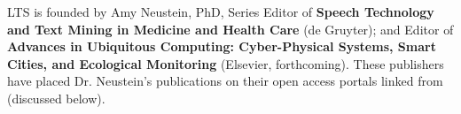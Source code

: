 \documentclass[11pt,letterpaper]{article}
\newcommand{\textscc}[1]{{\color{orr!35!black}{{%
						\fontfamily{Cabin-TLF}\fontseries{b}\selectfont{\textsc{\scriptsize{#1}}}}}}}
\newcommand{\AcronymText}[1]{{\textscc{#1}}}
\newcommand{\Cnineteen}{\resizebox{!}{7pt}{\AcronymText{CORD-19}}}
\newcommand{\llMOSAIC}{\mbox{{\LARGE MOSAIC}}}
\newcommand{\llWC}{\mbox{{\LARGE WhiteCharmDB}}}
\begin{document}
\setlength{\skip\footins}{18pt}	
	
{\linespread{1.2}\selectfont

\vspace*{3em}

\begin{center}




\begin{tcolorbox}
[
arc=2pt,outer arc=0pt,
enhanced jigsaw,
width=.92\textwidth,
colback=ctmcyan!50,
colframe=logoRed!30!darkRed,
drop shadow=logoPurple!50!darkRed,
]
\begin{minipage}{.99\textwidth}	
\begin{center}	
{\setlength{\fboxsep}{28pt}
	}
\end{center}
\end{minipage}
\end{tcolorbox}
\end{center}

\vspace*{1.25em}
\begin{center}
\parbox{.86\textwidth}{%
{\selectfont   
LTS is founded by Amy Neustein, PhD, 
Series Editor of {\bf Speech Technology and 
Text Mining in Medicine and Health Care} (de Gruyter); 
and Editor of {\bf Advances in Ubiquitous Computing: 
Cyber-Physical Systems, Smart Cities, 
and Ecological Monitoring} 
(Elsevier, forthcoming).  These 
publishers have placed Dr. Neustein's 
publications on their open access portals 
linked from \Cnineteen{} (discussed below).}}
\end{center}
\vspace*{.75em}	
	
}
\end{document}
